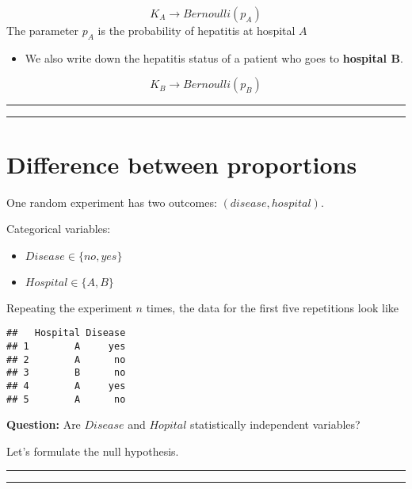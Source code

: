 \documentclass[
]{book}
\providecommand{\tightlist}{%
  \setlength{\itemsep}{0pt}\setlength{\parskip}{0pt}}
\begin{document}
\[K_A \rightarrow Bernoulli (p_A)\]
The parameter \(p_A\) is the probability of hepatitis at hospital \(A\)

\begin{itemize}
\tightlist
\item
  We also write down the hepatitis status of a patient who goes to \textbf{hospital B}.
\end{itemize}

\[K_B \rightarrow Bernoulli (p_B)\]

\begin{center}\rule{0.5\linewidth}{0.5pt}\end{center}

\begin{center}\rule{0.5\linewidth}{0.5pt}\end{center}

\hypertarget{difference-between-proportions-1}{%
\section{Difference between proportions}\label{difference-between-proportions-1}}

One random experiment has two outcomes: \((disease, hospital)\).

Categorical variables:

\begin{itemize}
\tightlist
\item
  \(Disease \in\{no, yes\}\)
\item
  \(Hospital \in \{A,B\}\)
\end{itemize}

Repeating the experiment \(n\) times, the data for the first five repetitions look like

\begin{verbatim}
##   Hospital Disease
## 1        A     yes
## 2        A      no
## 3        B      no
## 4        A     yes
## 5        A      no
\end{verbatim}

\textbf{Question:} Are \(Disease\) and \(Hopital\) statistically independent variables?

Let's formulate the null hypothesis.

\begin{center}\rule{0.5\linewidth}{0.5pt}\end{center}

\begin{center}\rule{0.5\linewidth}{0.5pt}\end{center}
\end{document}
